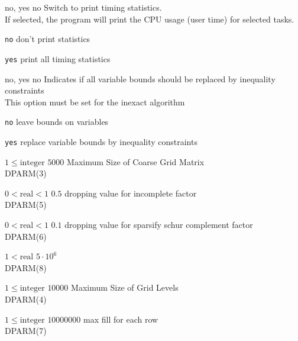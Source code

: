 %
{no, yes}%
{no}%
{Switch to print timing statistics.\\
If selected, the program will print the CPU usage (user time) for selected tasks.}%
{\begin{list}{}{
\setlength{\parsep}{0em}
\setlength{\leftmargin}{5ex}
\setlength{\labelwidth}{2ex}
\setlength{\itemindent}{0ex}
\setlength{\topsep}{0pt}}
\item[\texttt{no}] don't print statistics
\item[\texttt{yes}] print all timing statistics
\end{list}
}

%
{no, yes}%
{no}%
{Indicates if all variable bounds should be replaced by inequality constraints\\
This option must be set for the inexact algorithm}%
{\begin{list}{}{
\setlength{\parsep}{0em}
\setlength{\leftmargin}{5ex}
\setlength{\labelwidth}{2ex}
\setlength{\itemindent}{0ex}
\setlength{\topsep}{0pt}}
\item[\texttt{no}] leave bounds on variables
\item[\texttt{yes}] replace variable bounds by inequality constraints
\end{list}
}

%
{$1\leq\textrm{integer}$}%
{$5000$}%
{Maximum Size of Coarse Grid Matrix\\
DPARM(3)}%
{}

%
{$0<\textrm{real}<1$}%
{$0.5$}%
{dropping value for incomplete factor\\
DPARM(5)}%
{}

%
{$0<\textrm{real}<1$}%
{$0.1$}%
{dropping value for sparsify schur complement factor\\
DPARM(6)}%
{}

%
{$1<\textrm{real}$}%
{$5 \cdot 10^{  6}$}%
{\\
DPARM(8)}%
{}

%
{$1\leq\textrm{integer}$}%
{$10000$}%
{Maximum Size of Grid Levels\\
DPARM(4)}%
{}

%
{$1\leq\textrm{integer}$}%
{$10000000$}%
{max fill for each row\\
DPARM(7)}%
{}


